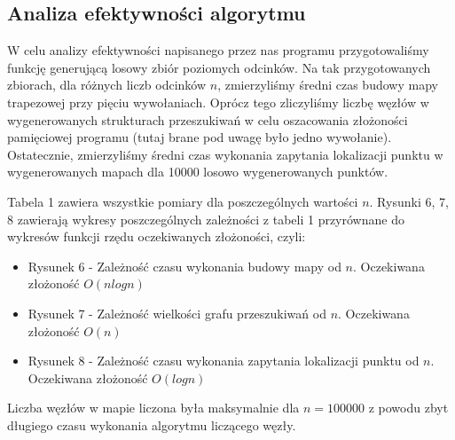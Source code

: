 \documentclass[11pt,a4paper]{article}
\begin{document}
\subsection{Analiza efektywności algorytmu}
W celu analizy efektywności napisanego przez nas programu
przygotowaliśmy funkcję generującą losowy zbiór 
poziomych odcinków. Na tak przygotowanych zbiorach,
dla różnych liczb odcinków $n$, zmierzyliśmy średni
czas budowy mapy trapezowej przy pięciu wywołaniach.
Oprócz tego zliczyliśmy liczbę węzłów w wygenerowanych
strukturach przeszukiwań w celu oszacowania złożoności
pamięciowej programu (tutaj brane pod uwagę było jedno wywołanie). 
Ostatecznie, zmierzyliśmy średni czas
wykonania zapytania lokalizacji punktu w wygenerowanych
mapach dla 10000 losowo wygenerowanych punktów.

Tabela 1 zawiera wszystkie pomiary dla poszczególnych
wartości $n$. Rysunki 6, 7, 8 zawierają wykresy
poszczególnych zależności z tabeli 1 przyrównane do wykresów
funkcji rzędu oczekiwanych złożoności, czyli:
\begin{itemize}
    \item Rysunek 6 
    - Zależność czasu wykonania budowy mapy od $n$. 
    Oczekiwana złożoność $O(nlogn)$
    \item Rysunek 7
    - Zależność wielkości grafu przeszukiwań od $n$. 
    Oczekiwana złożoność $O(n)$
    \item Rysunek 8 
    - Zależność czasu wykonania zapytania lokalizacji punktu od $n$. 
    Oczekiwana złożoność $O(logn)$
\end{itemize}

Liczba węzłów w mapie liczona była maksymalnie dla $n = 100000$
z powodu zbyt długiego czasu wykonania algorytmu liczącego węzły.
\end{document}
